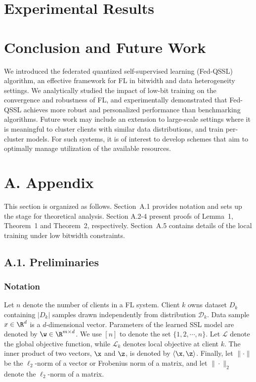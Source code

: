 \documentclass[a4paper,11pt]{article}
\begin{document}
\section{Experimental Results}


\section{Conclusion and Future Work}
We introduced the federated quantized self-supervised learning (Fed-QSSL) algorithm, an effective framework for FL in bitwidth and data heterogeneity settings. We analytically studied the impact of low-bit training on the convergence and robustness of FL, and experimentally demonstrated that Fed-QSSL achieves more robust and personalized performance than benchmarking algorithms. Future work may include an extension to large-scale settings where it is meaningful to cluster clients with similar data distributions, and train per-cluster models. 
For such systems, it is of interest to develop schemes that aim to optimally manage utilization of the available resources.


	\section*{A. Appendix}
	This section is organized as follows. Section~A.1 provides notation and sets up the stage for theoretical analysis. Section A.2-4 present proofs of Lemma~1, Theorem~1 and Theorem~2, respectively. Section~A.5 contains details of the local training under low bitwidth constraints.
	
	\subsection*{A.1. Preliminaries}
	\subsubsection*{Notation}
Let $n$ denote the number of clients in a FL system. Client $k$ owns dataset $D_k$ containing $|D_k|$ samples drawn independently from distribution $\mathcal{D}_k$. Data sample $x \in \R^d$ is a $d$-dimensional vector. Parameters of the learned SSL model are denoted by $\w \in \R^{m \times d}$. We use $[n]$ to denote the set $\{1, 2, \cdots, n \}$. Let $\mathcal{L}$ denote the global objective function, while $\mathcal{L}_k$ denotes local objective at client $k$. The inner product of two vectors, $\x$ and $\z$, is denoted by $\langle \x, \z \rangle$. Finally, let $\|\cdot \|$ be the $\ell_2$-norm of a vector or Frobenius norm of a matrix, and let $\| \cdot \|_2$ denote the $\ell_2$-norm of a matrix.
\end{document}
